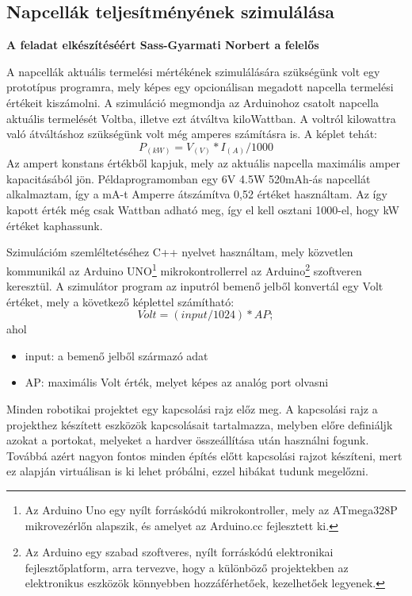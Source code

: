 \documentclass[
]{thesis-ekf}
\theoremstyle{definition}
\theoremstyle{remark}
\begin{document}
		\subsection{Napcellák teljesítményének szimulálása}
			\par \textbf{A feladat elkészítéséért Sass-Gyarmati Norbert a felelős}
			\par A napcellák aktuális termelési mértékének szimulálására szükségünk volt egy prototípus programra, mely képes egy opcionálisan megadott napcella termelési értékeit kiszámolni. A szimuláció megmondja az Arduinohoz csatolt napcella aktuális termelését Voltba, illetve ezt átváltva kiloWattban. A voltról kilowattra való átváltáshoz szükségünk volt még amperes számításra is. A képlet tehát:
			\[P_{(kW)} = V_{(V)} * I_{(A)} / 1000\]
			Az ampert konstans értékből kapjuk, mely az aktuális napcella maximális amper kapacitásából jön. Példaprogramomban egy 6V 4.5W 520mAh-ás napcellát alkalmaztam, így a mA-t Amperre átszámítva 0,52 értéket használtam. Az így kapott érték még csak Wattban adható meg, így el kell osztani 1000-el, hogy kW értéket kaphassunk.
			\par Szimulációm szemléltetéséhez C++ nyelvet használtam, mely közvetlen kommunikál az Arduino UNO\footnote{Az Arduino Uno egy nyílt forráskódú mikrokontroller, mely az ATmega328P mikrovezérlőn alapszik, és amelyet az Arduino.cc fejlesztett ki.\cite{uno}} mikrokontrollerrel az Arduino\footnote{Az Arduino egy szabad szoftveres, nyílt forráskódú elektronikai fejlesztőplatform, arra tervezve, hogy a különböző projektekben az elektronikus eszközök könnyebben hozzáférhetőek, kezelhetőek legyenek.\cite{arduino}} szoftveren keresztül. A szimulátor program az inputról bemenő jelből konvertál egy Volt értéket, mely a következő képlettel számítható:
			\[Volt = (input / 1024) * AP;\]
			ahol
			\begin{itemize}
				\item input: a bemenő jelből származó adat
				\item AP: maximális Volt érték, melyet képes az analóg port olvasni
			\end{itemize}
			\par Minden robotikai projektet egy kapcsolási rajz előz meg. A kapcsolási rajz a projekthez készített eszközök kapcsolásait tartalmazza, melyben előre definiáljk azokat a portokat, melyeket a hardver összeállítása után használni fogunk. Továbbá azért nagyon fontos minden építés előtt kapcsolási rajzot készíteni, mert ez alapján virtuálisan is ki lehet próbálni, ezzel hibákat tudunk megelőzni.
\end{document}
